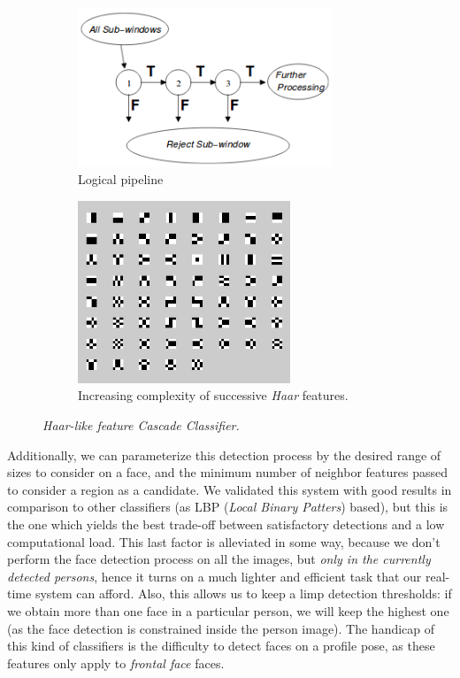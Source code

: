 	\begin{figure}[h]
		\centering
		\begin{subfigure}[b]{0.4\linewidth}
			\centering
			\includegraphics[width=3in]{images/cascade_classifier_pipeline}
			\caption{Logical pipeline}
			\label{fig:6_cascade_pipeline}
		\end{subfigure}
		\hfill
		\begin{subfigure}[b]{0.4\linewidth}
			\centering
			\includegraphics[width=2.5in]{images/haar_complexity}
			\caption{Increasing complexity of successive \emph{Haar} features.}
			\label{fig:6_haar_complexity}
		\end{subfigure}
		\caption{\emph{Haar-like feature Cascade Classifier.}}
		\label{fig:6_haar_cascade}
	\end{figure}	
	
		
		Additionally, we can parameterize this detection process by the desired range of sizes to consider on a face, and the minimum number of neighbor features passed to consider a region as a candidate. We validated this system with good results in comparison to other classifiers (as LBP (\emph{Local Binary Patters}) based), but this is the one which yields the best trade-off between satisfactory detections and a low computational load. This last factor is alleviated in some way, because we don't perform the face detection process on all the images, but \emph{only in the currently detected persons}, hence it turns on a much lighter and efficient task that our real-time system can afford. Also, this allows us to keep a limp detection thresholds: if we obtain more than one face in a particular person, we will keep the highest one (as the face detection is constrained inside the person image). The handicap of this kind of classifiers is the difficulty to detect faces on a profile pose, as these features only apply to \emph{frontal face} faces.\\
		
